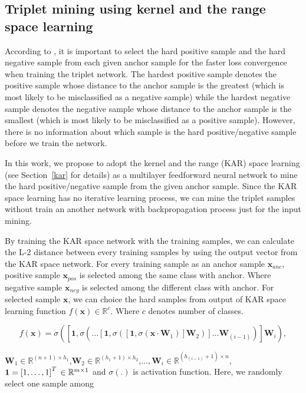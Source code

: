 \documentclass[runningheads]{llncs}
\begin{document}
\subsection{Triplet mining using kernel and the range space learning}
According to \cite{schroff2015facenet}, it is important to select the hard positive sample and the hard negative sample from each given anchor sample for the faster loss convergence when training the triplet network.
The hardest positive sample denotes the positive sample whose distance to the anchor sample is the greatest (which is most likely to be misclassified as a negative sample) while the hardest negative sample denotes the negative sample whose distance to the anchor sample is the smallest (which is most likely to be misclassified as a positive sample). However, there is no information about which sample is the hard positive/negative sample before we train the network.

In this work, we propose to adopt the kernel and the range (KAR) space learning (see Section~\ref{kar} for details) as a multilayer feedforward neural network to mine the hard positive/negative sample from the given anchor sample. Since the KAR space learning has no iterative learning process, we can mine the triplet samples without train an another network with backpropagation process just for the input mining.

By training the KAR space network with the training samples, we can calculate the L-2 distance between every training samples by using the output vector from the KAR space network. For every training sample as an anchor sample $\mathbf{x}_{anc}$, positive sample $\mathbf{x}_{pos}$ is selected among the same class with anchor. Where negative sample $\mathbf{x}_{neg}$ is selected among the different class with anchor.
For selected sample $\mathbf{x}$, we can choice the hard samples from output of KAR space learning function $f(\mathbf{x})\in{\mathbb{R}}^{c}$. Where $c$ denotes number of classes.

\begin{equation}
    f\left(\mathbf{x}\right) = \sigma\left(\left[\mathbf{1},\sigma\left(\dots\left[\mathbf{1},\sigma\left(\left[\mathbf{1},\sigma\left(\mathbf{x}\cdot\mathbf{W}_{1}\right)\right]\mathbf{W}_{2}\right)\right]\dots\mathbf{W}_{(i-1)}\right)\right]\mathbf{W}_{i}\right),
\end{equation}

$\mathbf{W}_{1}\in{\mathbb{R}}^{(n+1) \times h_{1}}$,$\mathbf{W}_{2}\in{\mathbb{R}}^{(h_{1}+1) \times h_{2}}$,$\dots,\mathbf{W}_{i}\in{\mathbb{R}}^{(h_{(i-1)}+1) \times n}$,$\mathbf{1}=\left[1,\dots,1\right]^{T}\\
\in{\mathbb{R}}^{m \times 1}$ and $\sigma(.)$ is activation function.
Here, we randomly select one sample among 
\end{document}

